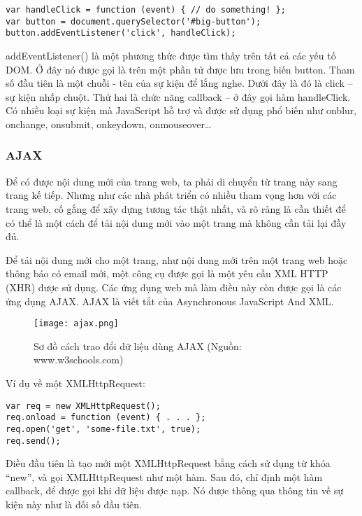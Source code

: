 \begin{lstlisting}
var handleClick = function (event) { // do something! }; 
var button = document.querySelector('#big-button'); 
button.addEventListener('click', handleClick);
\end{lstlisting}


addEventListener() là một phương thức được tìm thấy trên tất cả các yếu tố DOM. Ở đây nó được gọi là trên một phần tử được lưu trong biến button. Tham số đầu tiên là một chuỗi - tên của sự kiện để lắng nghe. Dưới đây là đó là click – sự kiện nhấp chuột. Thứ hai là chức năng callback – ở đây gọi hàm handleClick.
Có nhiều loại sự kiện mà JavaScript hỗ trợ và được sử dụng phổ biến như onblur, onchange, onsubmit, onkeydown, onmouseover…

\subsubsection{AJAX}

Để có được nội dung mới của trang web, ta phải di chuyển từ trang này sang trang kế tiếp. Nhưng như các nhà phát triển có nhiều tham vọng hơn với các trang web, cố gắng để xây dựng tương tác thật nhất, và rõ ràng là cần thiết để có thể là một cách để tải nội dung mới vào một trang mà không cần tải lại đầy đủ.

Để tải nội dung mới cho một trang, như nội dung mới trên một trang web hoặc thông báo có email mới, một công cụ được gọi là một yêu cầu XML HTTP (XHR) được sử dụng. Các ứng dụng web mà làm điều này còn được gọi là các ứng dụng AJAX. AJAX là viết tắt của Asynchronous JavaScript And XML.

\begin{figure}[!htb] 
\centering
\texttt{[image: ajax.png]}
\caption{Sơ đồ  cách trao đổi dữ liệu dùng AJAX (Nguồn: www.w3schools.com)}
\end{figure}

Ví dụ về một XMLHttpRequest:

\begin{lstlisting}
var req = new XMLHttpRequest(); 
req.onload = function (event) { . . . }; 
req.open('get', 'some-file.txt', true); 
req.send(); 
\end{lstlisting}

Điều đầu tiên là tạo mới một XMLHttpRequest bằng cách sử dụng từ khóa “new”, và gọi XMLHttpRequest như một hàm.
Sau đó, chỉ định một hàm callback, để được gọi khi dữ liệu được nạp. Nó được thông qua thông tin về sự kiện này như là đối số đầu tiên.


